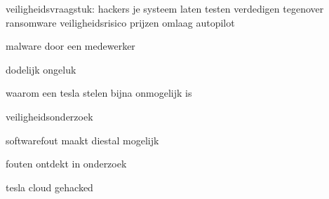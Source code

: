 \cite{cbrook06082021TeslaInsideDataThreft}

\cite{shilling25022021Tesla}
veiligheidsvraagstuk: hackers je systeem laten testen
verdedigen tegenover ransomware
veiligheidsrisico
prijzen omlaag
autopilot

\cite{randall05112019modelSurvey}
malware door een medewerker

\cite{}
dodelijk ongeluk

\cite{}

\cite{fottrell03092018TeslaSecurityChecks}
waarom een tesla stelen bijna onmogelijk is



veiligheidsonderzoek



softwarefout maakt diestal mogelijk


\cite{kirk26112020modelX}
fouten ontdekt in onderzoek

\cite{}

\cite{bbc24022021hyundaiBatteryFireFix}







tesla cloud gehacked
 

\cite{hawkins22102022}

 

\cite{gritti24062020tesladataengine}
 

\cite{bouchard07052019teslaDeepLearning}

 
\cite{Srikanth2019teslabigdata}

\cite{rangaiah25022020teslaAI}

\cite{marr08012018taslabigdataAI}

\cite{bdickson29072020teslalevelfive}

\cite{dcruz17062022tesladesignthink}
 





\cite{mcfarland22042021selfdrivingrisks}

\cite{hawkins18032021fedgovinvest}

\cite{berry21042021teslacrashtexas}

\cite{hull23072021regulatorsaftercrash}

\cite{wikiTeslaAutopilot}

\cite{nhtsaAutomatedVehiclesSafety}

\cite{dowling23042021autopilottricking}

\cite{wilson19042021teslacrashregulators}

